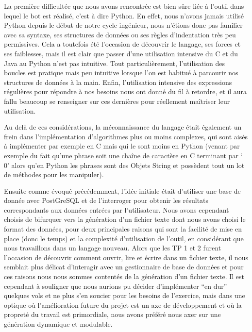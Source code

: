 \documentclass[]{article}
\begin{document}
\newpage
\Huge{\textbf{\color{title}{III) Difficultés rencontrées}}}

\bigskip
\bigskip
\large
{

La première difficultée que nous avons rencontrée est bien sûre liée à l’outil dans lequel le bot est réalisé, c’est à dire Python. En effet, nous n’avons jamais utilisé Python depuis le début de notre cycle ingénieur, nous n’étions donc pas familier avec sa syntaxe, ses structures de données ou ses règles d’indentation très peu permissives. Cela a toutefois été l’occasion de découvrir le langage, ses forces et ses faiblesses, mais il est clair que passer d’une utilisation intensive du C et du Java au Python n’est pas intuitive. Tout particulièrement, l’utilisation des boucles est pratique mais peu intuitive lorsque l’on est habitué à parcourir nos structures de données à la main. Enfin, l’utilisation intensive des expressions régulières pour répondre à nos besoins nous ont donné du fil à retordre, et il aura fallu beaucoup se renseigner sur ces dernières pour réellement maîtriser leur utilisation.

Au delà de ces considérations, la méconnaissance du langage était également un frein dans l’implémentation d’algorithmes plus ou moins complexes, qui sont aisés à implémenter par exemple en C mais qui le sont moins en Python (venant par exemple du fait qu’une phrase soit une chaîne de caractère en C terminant par ‘\\0’ alors qu’en Python les phrases sont des Objets String et possèdent tout un lot de méthodes pour les manipuler).

Ensuite comme évoqué précédemment, l’idée initiale était d’utiliser une base de donnée avec PostGreSQL et de l’interroger pour obtenir les résultats correspondants aux données entrées par l’utilisateur. Nous avons cependant choisis de bifurquer vers la génération d’un fichier texte dont nous avons choisi le format des données, pour deux principales raisons qui sont la facilité de mise en place (donc le temps) et la complexité d’utilisation de l’outil, en considérant que nous travaillons dans un langage nouveau. Alors que les TP 1 et 2 furent l’occasion de découvrir comment ouvrir, lire et écrire dans un fichier texte, il nous semblait plus délicat d'interagir avec un gestionnaire de base de données et pour ces raisons nous nous sommes contentés de la génération d’un fichier texte. Il est cependant à souligner que nous aurions pu décider d’implémenter “en dur” quelques vols et ne plus s’en soucier pour les besoins de l’exercice, mais dans une optique où l’amélioration future du projet est un axe de développement et où la propreté du travail est primordiale, nous avons préféré nous axer sur une génération dynamique et modulable.

}
\end{document}
